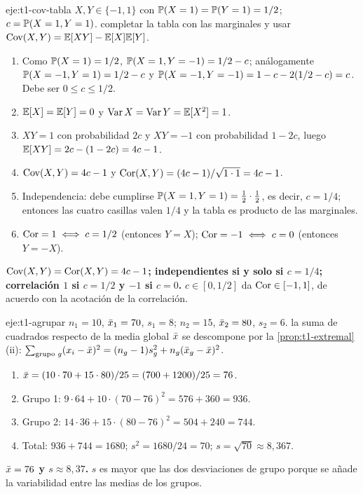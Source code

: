 \begin{solucion}{eje:t1-cov-tabla}
\datos $X,Y\in\{-1,1\}$ con $\mathbb{P}(X=1)=\mathbb{P}(Y=1)=1/2$; $c=\mathbb{P}(X=1,Y=1)$.
\planteamiento completar la tabla con las marginales y usar $\operatorname{Cov}(X,Y)=\mathbb{E}[XY]-\mathbb{E}[X]\mathbb{E}[Y]$.
\pasos
\begin{enumerate}[label=\arabic*.]
  \item Como $\mathbb{P}(X=1)=1/2$, $\mathbb{P}(X=1,Y=-1)=1/2-c$; análogamente $\mathbb{P}(X=-1,Y=1)=1/2-c$ y $\mathbb{P}(X=-1,Y=-1)=1-c-2(1/2-c)=c$. Debe ser $0\le c\le1/2$.
  \item $\mathbb{E}[X]=\mathbb{E}[Y]=0$ y $\operatorname{Var} X=\operatorname{Var} Y=\mathbb{E}[X^{2}]=1$.
  \item $XY=1$ con probabilidad $2c$ y $XY=-1$ con probabilidad $1-2c$, luego $\mathbb{E}[XY]=2c-(1-2c)=4c-1$.
  \item $\operatorname{Cov}(X,Y)=4c-1$ y $\operatorname{Cor}(X,Y)=(4c-1)/\sqrt{1\cdot1}=4c-1$.
  \item Independencia: debe cumplirse $\mathbb{P}(X=1,Y=1)=\frac12\cdot\frac12$, es decir, $c=1/4$; entonces las cuatro casillas valen $1/4$ y la tabla es producto de las marginales.
  \item $\operatorname{Cor}=1\iff c=1/2$ (entonces $Y=X$); $\operatorname{Cor}=-1\iff c=0$ (entonces $Y=-X$).
\end{enumerate}
\resultado \textbf{$\operatorname{Cov}(X,Y)=\operatorname{Cor}(X,Y)=4c-1$; independientes si y solo si $c=1/4$; correlación $1$ si $c=1/2$ y $-1$ si $c=0$.}
\comprobacion $c\in[0,1/2]$ da $\operatorname{Cor}\in[-1,1]$, de acuerdo con la acotación de la correlación.
\end{solucion}

\begin{solucion}{eje:t1-agrupar}
\datos $n_1=10$, $\bar{x}_1=70$, $s_1=8$; $n_2=15$, $\bar{x}_2=80$, $s_2=6$.
\planteamiento la suma de cuadrados respecto de la media global $\bar{x}$ se descompone por la \cref{prop:t1-extremal}(ii): $\sum_{\text{grupo }g}(x_i-\bar{x})^{2}=(n_g-1)s_g^{2}+n_g(\bar{x}_g-\bar{x})^{2}$.
\pasos
\begin{enumerate}[label=\arabic*.]
  \item $\bar{x}=(10\cdot70+15\cdot80)/25=(700+1200)/25=76$.
  \item Grupo 1: $9\cdot64+10\cdot(70-76)^{2}=576+360=936$.
  \item Grupo 2: $14\cdot36+15\cdot(80-76)^{2}=504+240=744$.
  \item Total: $936+744=1680$; $s^{2}=1680/24=70$; $s=\sqrt{70}\approx8{,}367$.
\end{enumerate}
\resultado \textbf{$\bar{x}=76$ y $s\approx8{,}37$.}
\comprobacion $s$ es mayor que las dos desviaciones de grupo porque se añade la variabilidad entre las medias de los grupos.
\end{solucion}

